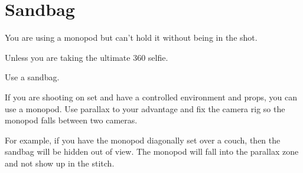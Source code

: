 \section{Sandbag}
\pagecolor{white}
\label{chap:12}
\begin{fullwidth}

\problem

{\large You are using a monopod but can’t hold it without being in the shot. \par}

Unless you are taking the ultimate 360 selfie. 

\solution

{\large Use a sandbag. \par}

If you are shooting on set and have a controlled environment and props, you can use a monopod. Use parallax to your advantage and fix the camera rig so the monopod falls between two cameras. 

For example, if you have the monopod diagonally set over a couch, then the sandbag will be hidden out of view. The monopod will fall into the parallax zone and not show up in the stitch. 



\clearpage
\end{fullwidth}
